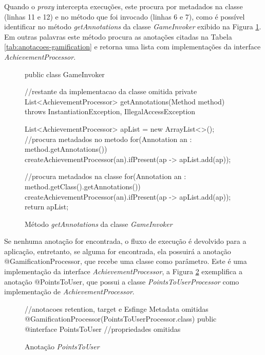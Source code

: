 Quando o \textit{proxy} intercepta execuções, este procura por metadados na classe (linhas 11 e 12) e no método que foi invocado (linhas 6 e 7), como é possível identificar no método \textit{getAnnotations} da classe \textit{GameInvoker} exibido na Figura \ref{fig:buscando-metadados-game-invoker}. Em outras palavras este método procura as anotações citadas na Tabela \ref{tab:anotacoes-gamification} e retorna uma lista com implementações da interface \textit{AchievementProcessor}.

\begin{figure}[H]
    \centering
    \begin{java}
public class GameInvoker {
//restante da implementacao da classe omitida
    private List<AchievementProcessor> getAnnotations(Method method) throws InstantiationException, IllegalAccessException {
		List<AchievementProcessor> apList = new ArrayList<>();
		//procura metadados no metodo
		for(Annotation an : method.getAnnotations()){
			createAchievementProcessor(an).ifPresent(ap -> apList.add(ap));	
		}
		
		//procura metadados na classe
		for(Annotation an : method.getClass().getAnnotations()){
			createAchievementProcessor(an).ifPresent(ap -> apList.add(ap));	
		}
		return apList;
	}
}    
    \end{java}
    \caption{Método \textit{getAnnotations} da classe \textit{GameInvoker}}
    \label{fig:buscando-metadados-game-invoker}
\end{figure}

Se nenhuma anotação for encontrada, o fluxo de execução é devolvido para a aplicação, entretanto, se alguma for encontrada, ela possuirá a anotação @GamificationProcessor, que recebe uma classe como parâmetro. Este é uma implementação da interface \textit{AchievementProcessor}, a Figura \ref{fig:exemplo-gamificationprocess} exemplifica a anotação @PointsToUser, que possui a classe \textit{PointsToUserProcessor} como implementação de \textit{AchievementProcessor}.

\begin{figure}[H]
    \centering
    \begin{java}
//anotacoes retention, target e Esfinge Metadata omitidas
@GamificationProcessor(PointsToUserProcessor.class)
public @interface PointsToUser {	
//propriedades omitidas
}
    \end{java}
    \caption{Anotação \textit{PointsToUser}}
    \label{fig:exemplo-gamificationprocess}
\end{figure}


